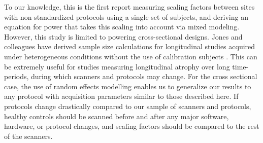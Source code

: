 To our knowledge, this is the first report measuring scaling factors between sites with non-standardized protocols using a single set of subjects, and deriving an equation for power that takes this scaling into account via mixed modeling. However, this study is limited to powering cross-sectional designs. Jones and colleagues have derived sample size calculations for longitudinal studies acquired under heterogeneous conditions without the use of calibration subjects \cite{jones2013quantification}. This can be extremely useful for studies measuring longitudinal atrophy over long time-periods, during which scanners and protocols may change. For the cross sectional case, the use of random effects modelling enables us to generalize our results to any protocol with acquisition parameters similar to those described here. If protocols change drastically compared to our sample of scanners and protocols, healthy controls should be scanned before and after any major software, hardware, or protocol changes, and scaling factors should be compared to the rest of the scanners.